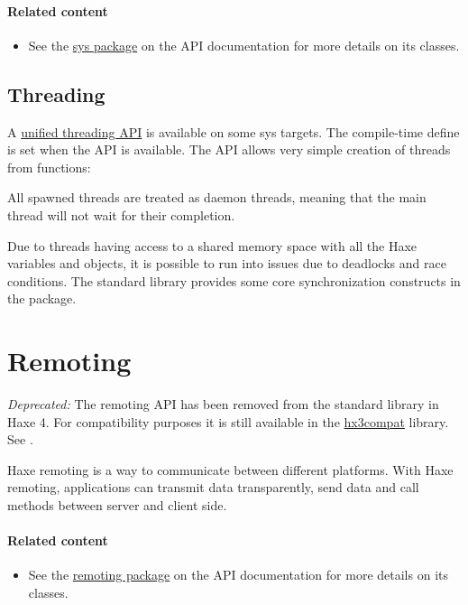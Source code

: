 \paragraph{Related content}
\begin{itemize}
	\item See the \href{https://api.haxe.org/sys/}{sys package} on the API documentation for more details on its classes.
\end{itemize}

\subsection{Threading}
\label{std-threading}


A \href{https://api.haxe.org/sys/thread/Thread.html}{unified threading API} is available on some sys targets. The compile-time define  is set when the API is available. The API allows very simple creation of threads from functions:


All spawned threads are treated as daemon threads, meaning that the main thread will not wait for their completion.

Due to threads having access to a shared memory space with all the Haxe variables and objects, it is possible to run into issues due to deadlocks and race conditions. The standard library provides some core synchronization constructs in the \href{https://api.haxe.org/sys/thread/}{} package.


\section{Remoting}
\label{std-remoting}


\emph{Deprecated:} The remoting API has been removed from the standard library in Haxe 4. For compatibility purposes it is still available in the \href{https://github.com/HaxeFoundation/hx3compat/}{hx3compat} library. See .

Haxe remoting is a way to communicate between different platforms. With Haxe remoting, applications can transmit data transparently, send data and call methods between server and client side.

\paragraph{Related content}
\begin{itemize}
	\item See the \href{https://api.haxe.org/haxe/remoting/}{remoting package} on the API documentation for more details on its classes.
\end{itemize}

